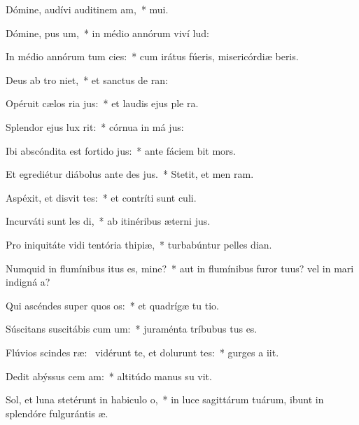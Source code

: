 \item Dómine, audívi auditinem am,~*  mui.
\item Dómine, pus um,~* in médio annórum viví lud:
\item In médio annórum tum cies:~* cum irátus fúeris, misericórdiæ beris.
\item Deus ab tro niet,~* et sanctus de  ran:
\item Opéruit cælos ria jus:~* et laudis ejus ple  ra.
\item Splendor ejus  lux rit:~* córnua in má jus:
\item Ibi abscóndita est fortido jus:~* ante fáciem  bit mors.
\item Et egrediétur diábolus ante des jus.~* Stetit, et men  ram.
\item Aspéxit, et disvit tes:~* et contríti sunt  culi.
\item Incurváti sunt les di,~* ab itinéribus æterni jus.
\item Pro iniquitáte vidi tentória thipiæ,~* turbabúntur pelles  dian.
\item Numquid in flumínibus itus es, mine?~* aut in flumínibus furor tuus? vel in mari indigná a?
\item Qui ascéndes super quos os:~* et quadrígæ tu tio.
\item Súscitans suscitábis cum um:~* juraménta tríbubus  tus es.
\item Flúvios scindes ræ:~\pscross{} vidérunt te, et dolurunt tes:~* gurges a iit.
\item Dedit abýssus cem am:~* altitúdo manus su vit.
\item Sol, et luna stetérunt in habiculo o,~* in luce sagittárum tuárum, ibunt in splendóre fulgurántis  æ.
